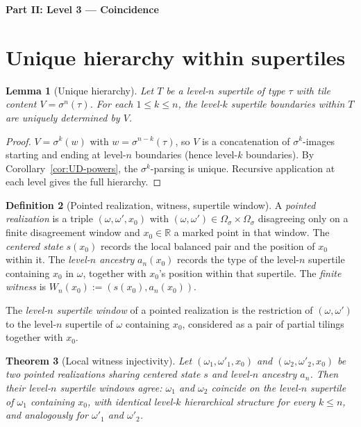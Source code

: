 \documentclass[11pt]{article}
\theoremstyle{plain}
\newtheorem{theorem}{Theorem}[section]
\newtheorem{lemma}[theorem]{Lemma}
\theoremstyle{definition}
\newtheorem{definition}[theorem]{Definition}
\theoremstyle{remark}
\newcommand{\R}{\mathbb{R}}
\begin{document}
\begin{center}\textbf{Part II: Level 3 --- Coincidence}\end{center}

\section{Unique hierarchy within supertiles}\label{sec:hierarchy}

\begin{lemma}[Unique hierarchy]\label{lem:unique-hier}
Let $T$ be a level-$n$ supertile of type $\tau$ with tile content $V=\sigma^n(\tau)$. For each $1\le k\le n$, the level-$k$ supertile boundaries within $T$ are uniquely determined by $V$.
\end{lemma}

\begin{proof}
$V=\sigma^k(w)$ with $w=\sigma^{n-k}(\tau)$, so $V$ is a concatenation of $\sigma^k$-images starting and ending at level-$n$ boundaries (hence level-$k$ boundaries). By Corollary~\ref{cor:UD-powers}, the $\sigma^k$-parsing is unique. Recursive application at each level gives the full hierarchy.
\end{proof}

\begin{definition}[Pointed realization, witness, supertile window]\label{def:pointed}
A \emph{pointed realization} is a triple $(\omega,\omega',x_0)$ with $(\omega,\omega')\in\Omega_\sigma\times\Omega_\sigma$ disagreeing only on a finite disagreement window and $x_0\in\R$ a marked point in that window. The \emph{centered state} $s(x_0)$ records the local balanced pair and the position of $x_0$ within it. The \emph{level-$n$ ancestry} $a_n(x_0)$ records the type of the level-$n$ supertile containing $x_0$ in $\omega$, together with $x_0$'s position within that supertile. The \emph{finite witness} is $W_n(x_0):=(s(x_0),a_n(x_0))$.

The \emph{level-$n$ supertile window} of a pointed realization is the restriction of $(\omega,\omega')$ to the level-$n$ supertile of $\omega$ containing $x_0$, considered as a pair of partial tilings together with $x_0$.
\end{definition}

\begin{theorem}[Local witness injectivity]\label{thm:winj}
Let $(\omega_1,\omega'_1,x_0)$ and $(\omega_2,\omega'_2,x_0)$ be two pointed realizations sharing centered state $s$ and level-$n$ ancestry $a_n$. Then their level-$n$ supertile windows agree: $\omega_1$ and $\omega_2$ coincide on the level-$n$ supertile of $\omega_1$ containing $x_0$, with identical level-$k$ hierarchical structure for every $k\le n$, and analogously for $\omega'_1$ and $\omega'_2$.
\end{theorem}
\end{document}
